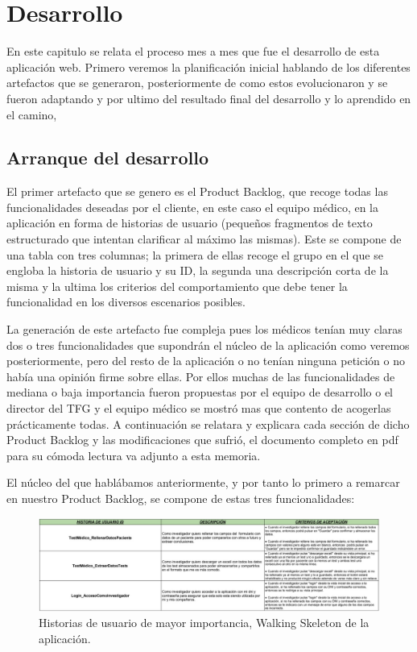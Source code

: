 \chapter{Desarrollo}

En este capitulo se relata el proceso mes a mes que fue el desarrollo de esta aplicación web. Primero veremos la planificación inicial hablando de los diferentes artefactos que se generaron, posteriormente de como estos evolucionaron y se fueron adaptando y por ultimo del resultado final del desarrollo y lo aprendido en el camino,

\section{Arranque del desarrollo}

El primer artefacto que se genero es el Product Backlog, que recoge todas las funcionalidades deseadas por el cliente, en este caso el equipo médico, en la aplicación en forma de historias de usuario (pequeños fragmentos de texto estructurado que intentan clarificar al máximo las mismas). Este se compone de una tabla con tres columnas; la primera de ellas recoge el grupo en el que se engloba la historia de usuario y su ID, la segunda una descripción corta de la misma y la ultima los criterios del comportamiento que debe tener la funcionalidad en los diversos escenarios posibles.
\newline

La generación de este artefacto fue compleja pues los médicos tenían muy claras dos o tres funcionalidades que supondrán el núcleo de la aplicación como veremos posteriormente, pero del resto de la aplicación o no tenían ninguna petición o no había una opinión firme sobre ellas. Por ellos muchas de las funcionalidades de mediana o baja importancia fueron propuestas por el equipo de desarrollo o el director del TFG y el equipo médico se mostró mas que contento de acogerlas prácticamente todas. A continuación se relatara y explicara cada sección de dicho Product Backlog y las modificaciones que sufrió, el documento completo en pdf para su cómoda lectura va adjunto a esta memoria.
\newpage

El núcleo del que hablábamos anteriormente, y por tanto lo primero a remarcar en nuestro Product Backlog, se compone de estas tres funcionalidades:
\newline

 \begin{figure}[h]
    \centering
     \includegraphics[width=1\textwidth]{images/historiasUsuario-1.jpg}
    \caption{Historias de usuario de mayor importancia, Walking Skeleton de la aplicación.}
\end{figure}


